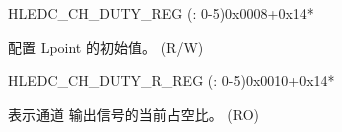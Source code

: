 \begin{register}{H}{LEDC\_CH\_DUTY\_REG (: 0-5)}{0x0008+0x14*}\label{regdesc:LEDCCHNDUTYREG}
%
%
\regnewline%
\begin{regdesc}\begin{reglist}
\label{fielddesc:LEDCDUTYCHN}\item [LEDC\_DUTY\_CH\regindex{n}] 配置 Lpoint 的初始值。 (R/W)
\end{reglist}\end{regdesc}
\end{register}


\begin{register}{H}{LEDC\_CH\_DUTY\_R\_REG (: 0-5)}{0x0010+0x14*}\label{regdesc:LEDCCHNDUTYRREG}
%
%
\regnewline%
\begin{regdesc}\begin{reglist}
\label{fielddesc:LEDCDUTYCHNR}\item [LEDC\_DUTY\_CH\regindex{n}\_R] 表示通道  输出信号的当前占空比。 (RO)
\end{reglist}\end{regdesc}
\end{register}


